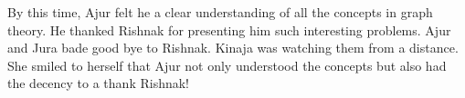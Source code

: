 By this time, Ajur felt he a clear understanding of all the concepts in graph theory. He thanked Rishnak for presenting him such interesting problems. Ajur and Jura bade good bye to Rishnak.  Kinaja was watching them from a distance. She smiled to herself that Ajur not only understood the concepts but also had the decency to a thank Rishnak!